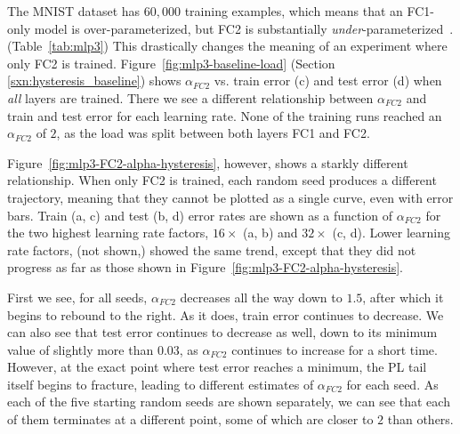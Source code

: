 The MNIST dataset has $60,000$ training examples, which means that an FC1-only model is over-parameterized, but FC2 is 
substantially \emph{under}-parameterized~\cite{DLM19_Exact_TR}. (Table~\ref{tab:mlp3}) This drastically changes the 
meaning of an experiment where only FC2 is trained. Figure~\ref{fig:mlp3-baseline-load} (Section 
\ref{sxn:hysteresis_baseline}) shows $\alpha_{FC2}$ vs. train error (c) and test error (d) when \emph{all} layers are 
trained. There we see a different relationship between $\alpha_{FC2}$ and train and test error for each learning rate. 
None of the training runs reached an $\alpha_{FC2}$ of $2$, as the load was split between both layers FC1 and FC2.

Figure~\ref{fig:mlp3-FC2-alpha-hysteresis}, however, shows a starkly different relationship. 
When only FC2 is trained, 
each random seed produces a different trajectory, meaning that they cannot be plotted as a single curve, even with error 
bars. Train (a, c) and test (b, d) error rates are shown as a function of $\alpha_{FC2}$ for the two highest learning 
rate factors, $16\times$ (a, b) and $32\times$ (c, d). Lower learning rate factors, (not shown,) showed the same trend, except 
that they did not progress as far as those shown in Figure~\ref{fig:mlp3-FC2-alpha-hysteresis}.

First we see, for all seeds, $\alpha_{FC2}$ decreases all the way down to $1.5$, after which it begins to rebound to the 
right. As it 
does, train error continues to decrease. We can also see that test error continues to decrease as well, down to its minimum 
value of slightly more than $0.03$, as $\alpha_{FC2}$ continues to increase for a short time. However, at the exact 
point where test error reaches a minimum, the PL tail itself begins to fracture, leading to different estimates 
of $\alpha_{FC2}$ for each seed. As each of the five starting random seeds are shown separately, we can see that each of 
them terminates at a different point, some of which are closer to $2$ than others.

